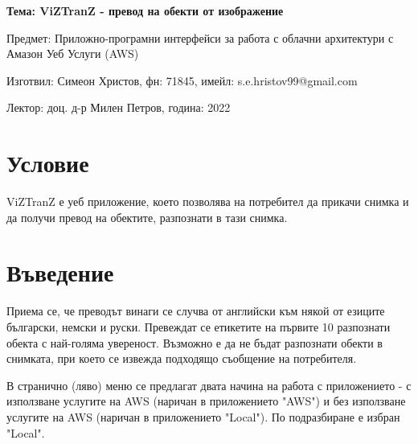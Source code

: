 \documentclass[12pt]{article}
\begin{document}
	\begin{center}
        \LARGE{\textbf{Тема: ViZTranZ - превод на обекти от изображение}}
        
        \bigskip
        \Large{Предмет: Приложно-програмни интерфейси за работа с облачни архитектури с Амазон Уеб Услуги (AWS)}
        
        \medskip
        \Large{Изготвил: Симеон Христов, фн: 71845, имейл: s.e.hristov99@gmail.com}
        
        \medskip
        \Large{Лектор: доц. д-р Милен Петров, година: 2022}
        
        \bigskip
	\end{center}
    
    
    \tableofcontents
    \bigskip
    \bigskip
    \newpage
  
\section{Условие} 

\noindent ViZTranZ е уеб приложение, което позволява на потребител да прикачи снимка и да получи превод на обектите, разпознати в тази снимка.

\section{Въведение}

\noindent Приема се, че преводът винаги се случва от английски към някой от езиците български, немски и руски. Превеждат се етикетите на първите 10 разпознати обекта с най-голяма увереност. Възможно е да не бъдат разпознати обекти в снимката, при което се извежда подходящо съобщение на потребителя.

\noindent В странично (ляво) меню се предлагат двата начина на работа с приложението - с използване услугите на AWS (наричан в приложението "AWS") и без използване услугите на AWS (наричан в приложението "Local"). По подразбиране е избран "Local".
\end{document}
